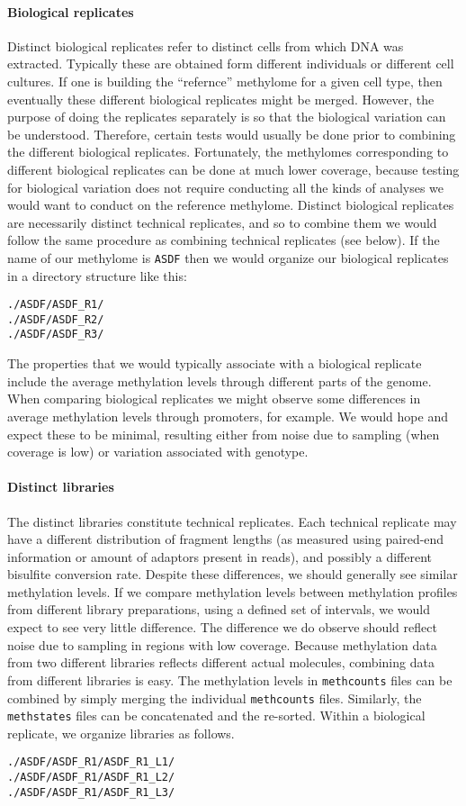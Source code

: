 \documentclass[10pt]{article}
\newcommand{\fn}[1]{\texttt{#1}}
\begin{document}
\paragraph{Biological replicates}
Distinct biological replicates refer to distinct cells from which DNA
was extracted. Typically these are obtained form different individuals
or different cell cultures. If one is building the ``refernce''
methylome for a given cell type, then eventually these different
biological replicates might be merged. However, the purpose of doing
the replicates separately is so that the biological variation can be
understood. Therefore, certain tests would usually be done prior to
combining the different biological replicates. Fortunately, the
methylomes corresponding to different biological replicates can be
done at much lower coverage, because testing for biological variation
does not require conducting all the kinds of analyses we would want to
conduct on the reference methylome. Distinct biological replicates are
necessarily distinct technical replicates, and so to combine them we
would follow the same procedure as combining technical replicates (see
below). If the name of our methylome is \texttt{ASDF} then we
would organize our biological replicates in a directory structure like
this:
\begin{verbatim}
./ASDF/ASDF_R1/
./ASDF/ASDF_R2/
./ASDF/ASDF_R3/
\end{verbatim}
The properties that we would typically associate with a biological
replicate include the average methylation levels through different
parts of the genome. When comparing biological replicates we might
observe some differences in average methylation levels through
promoters, for example. We would hope and expect these to be minimal,
resulting either from noise due to sampling (when coverage is low) or
variation associated with genotype.

\paragraph{Distinct libraries}
The distinct libraries constitute technical replicates.  Each
technical replicate may have a different distribution of fragment
lengths (as measured using paired-end information or amount of
adaptors present in reads), and possibly a different bisulfite
conversion rate.  Despite these differences, we should generally see
similar methylation levels. If we compare methylation levels between
methylation profiles from different library preparations, using a
defined set of intervals, we would expect to see very little
difference. The difference we do observe should reflect noise due to
sampling in regions with low coverage.  Because methylation data from
two different libraries reflects different actual molecules, combining
data from different libraries is easy. The methylation levels in
\fn{methcounts} files can be combined by simply merging the individual
\fn{methcounts} files.  Similarly, the \fn{methstates} files can be
concatenated and the re-sorted. Within a biological replicate, we
organize libraries as follows.
\begin{verbatim}
./ASDF/ASDF_R1/ASDF_R1_L1/
./ASDF/ASDF_R1/ASDF_R1_L2/
./ASDF/ASDF_R1/ASDF_R1_L3/
\end{verbatim}
\end{document}
